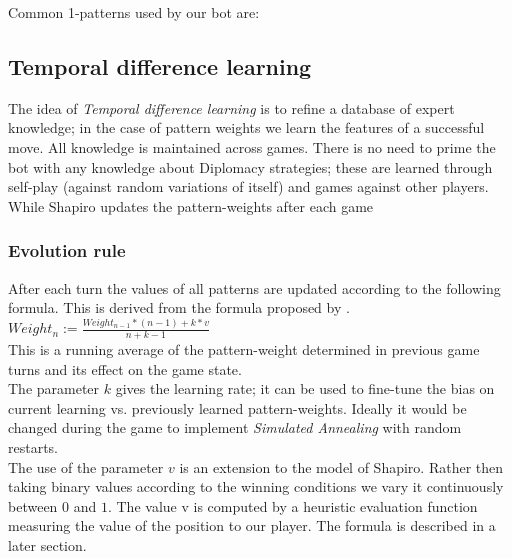 \documentclass[pdftex,12pt,a4paper]{report}
\begin{document}
Common 1-patterns used by our bot are:



\subsection{Temporal difference learning}

The idea of \textit{Temporal difference learning} is to refine a
database of expert knowledge; in the case of pattern weights we learn
the features of a successful move. All knowledge is maintained across
games. There is no need to prime the bot with any knowledge about
Diplomacy strategies; these are learned through self-play (against
random variations of itself) and games against other players. While 
Shapiro \cite{Shapiro02} updates the pattern-weights after each game \\

\subsubsection{Evolution rule}

After each turn the values of all patterns are updated
according to the following formula. This is derived from
the formula proposed by \cite{Shapiro02}. \\

$Weight_{n} := \frac{Weight_{n-1}*(n-1)+k*v}{n+k-1}$ \\

This is a running average of the pattern-weight determined
in previous game turns and its effect on the game state. \\

The parameter $k$ gives the learning rate; it can be used
to fine-tune the bias on current learning vs. previously
learned pattern-weights. Ideally it would be changed during
the game to implement \textit{Simulated Annealing} with
random restarts. \\

The use of the parameter $v$ is an extension to the model
of Shapiro. Rather then taking binary values according to
the winning conditions we vary it continuously between
$0$ and $1$. The value v is computed by a heuristic 
evaluation function measuring the value of the position
to our player. The formula is described in a later section. \\
\end{document}
